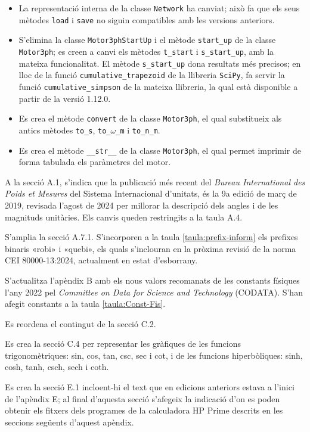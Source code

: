 \begin{itemize}
	\item La representació interna de la classe \texttt{Network} ha canviat; això fa que els seus mètodes \texttt{load} i  \texttt{save} no siguin compatibles amb les versions anteriors. 
	\item S'elimina la classe  \texttt{Motor3phStartUp} i el mètode  \texttt{start\_up} de la classe  \texttt{Motor3ph}; es creen a canvi els mètodes   \texttt{t\_start} i  \texttt{s\_start\_up}, amb la mateixa funcionalitat. 	El mètode \texttt{s\_start\_up} dona  resultats més precisos; en lloc de la  funció \texttt{cumulative\_trapezoid} de la llibreria \texttt{SciPy}, fa servir la funció \texttt{cumulative\_simpson} de la mateixa llibreria, la qual està disponible a partir de la versió 1.12.0. 
	\item Es crea el mètode \texttt{convert} de la classe \texttt{Motor3ph}, el qual substitueix als antics mètodes \texttt{to\_s},  \texttt{to\_$\omega$\_m} i \texttt{to\_n\_m}.
	\item Es crea el mètode  \texttt{\_\_str\_\_} de la classe \texttt{Motor3ph}, el qual permet imprimir de forma tabulada els paràmetres del motor.
\end{itemize}
	
 
A la secció A.1, s'indica que la publicació més recent del \textit{Bureau 	International des Poids et Mesures} del Sistema Internacional d'unitats, és la  9a edició de març de 2019, revisada l'agost de 2024 per millorar la descripció dels angles i de les 
magnituds unitàries. Els canvis queden restringits a la taula A.4.

S'amplia la secció A.7.1. S'incorporen a la taula \ref{taula:prefix-inform} els prefixes binaris «robi» i «quebi», els quals s'inclouran en la pròxima revisió de la norma CEI 80000-13:2024, actualment en estat d'esborrany.

S'actualitza l'apèndix  B amb els nous valors recomanats de les constants físiques  l'any 2022 pel \textit{Committee on Data for Science and Technology} (CODATA). S'han afegit constants a la taula \ref{taula:Const-Fis}.

Es reordena el contingut de la secció C.2.

Es crea la secció C.4 per  representar les gràfiques de les funcions trigonomètriques: sin, cos, tan, csc, sec i cot, i de les funcions hiperbòliques: sinh, cosh, tanh, csch, sech i coth.

Es crea la secció E.1 incloent-hi el text que en edicions anteriors estava a l'inici de l'apèndix E; al final d'aquesta secció s'afegeix la indicació d'on es poden obtenir els fitxers dels programes de la calculadora \textsf{HP Prime} descrits en les seccions següents d'aquest apèndix.

